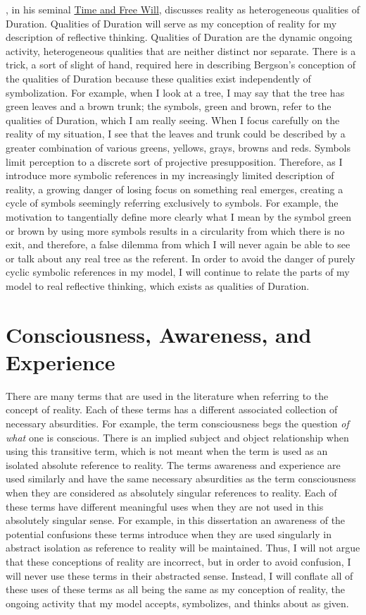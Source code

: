 \cite{bergson:1910}, in his seminal \underline{Time and Free Will},
discusses reality as heterogeneous qualities of Duration.  Qualities
of Duration will serve as my conception of reality for my description
of reflective thinking.  Qualities of Duration are the dynamic ongoing
activity, heterogeneous qualities that are neither distinct nor
separate.  There is a trick, a sort of slight of hand, required here
in describing Bergson's conception of the qualities of Duration
because these qualities exist independently of symbolization.  For
example, when I look at a tree, I may say that the tree has green
leaves and a brown trunk; the symbols, green and brown, refer to the
qualities of Duration, which I am really seeing.  When I focus
carefully on the reality of my situation, I see that the leaves and
trunk could be described by a greater combination of various greens,
yellows, grays, browns and reds.  Symbols limit perception to a
discrete sort of projective presupposition.  Therefore, as I introduce
more symbolic references in my increasingly limited description of
reality, a growing danger of losing focus on something real emerges,
creating a cycle of symbols seemingly referring exclusively to
symbols.  For example, the motivation to tangentially define more
clearly what I mean by the symbol green or brown by using more symbols
results in a circularity from which there is no exit, and therefore, a
false dilemma from which I will never again be able to see or talk
about any real tree as the referent.  In order to avoid the danger of
purely cyclic symbolic references in my model, I will continue to
relate the parts of my model to real reflective thinking, which exists
as qualities of Duration.

\section{Consciousness, Awareness, and Experience}

There are many terms that are used in the literature when referring to
the concept of reality.  Each of these terms has a different
associated collection of necessary absurdities.  For example, the term
consciousness begs the question \emph{of what} one is conscious.
There is an implied subject and object relationship when using this
transitive term, which is not meant when the term is used as an
isolated absolute reference to reality.  The terms awareness and
experience are used similarly and have the same necessary absurdities
as the term consciousness when they are considered as absolutely
singular references to reality.  Each of these terms have different
meaningful uses when they are not used in this absolutely singular
sense.  For example, in this dissertation an awareness of the
potential confusions these terms introduce when they are used
singularly in abstract isolation as reference to reality will be
maintained.  Thus, I will not argue that these conceptions of reality
are incorrect, but in order to avoid confusion, I will never use these
terms in their abstracted sense.  Instead, I will conflate all of
these uses of these terms as all being the same as my conception of
reality, the ongoing activity that my model accepts, symbolizes, and
thinks about as given.

